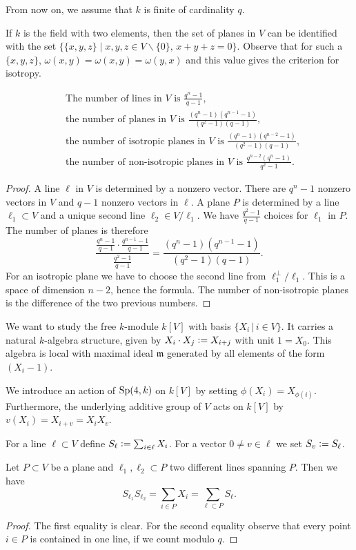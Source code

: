 From now on, we assume that $k$ is finite of cardinality $q$.
\begin{remark} \label{PlaneTriple}
 If $k$ is the field with two elements, then the set of planes in $V$ can be identified with the set $\{\{x,y,z\}\;|\;x,y,z\in V\backslash\{0\},\,x+y+z=0\}$. Observe that for such a $\{x,y,z\}$, $\omega(x,y)=\omega(x,y)=\omega(y,x)$ and this value gives the criterion for isotropy.
\end{remark}
\begin{proposition}\label{OrbitesSp}
\begin{align}
&\text{The number of lines in $V$ is }\frac{q^n-1}{q-1}, \\
&\text{the number of planes in $V$ is }\frac{(q^n-1)(q^{n-1}-1)}{(q^2-1)(q-1)}, \\
&\text{the number of isotropic planes in $V$ is }\frac{(q^n-1)(q^{n-2}-1)}{(q^2-1)(q-1)}, \\
&\text{the number of non-isotropic planes in $V$ is }\frac{q^{n-2}(q^n-1)}{q^2-1}.
\end{align}
\end{proposition}
\begin{proof}
A line $\ell$ in $V$ is determined by a nonzero vector. There are $q^n - 1$ nonzero vectors in $V$ and $q-1$ nonzero vectors in $\ell$. A plane $P$ is determined by a line $\ell_1 \subset V$ and a unique second line $\ell_2\in V/\ell_1$. We have $\frac{q^2-1}{q-1}$ choices for $\ell_1$ in $P$. The number of planes is therefore
$$
\frac{ \frac{q^n-1}{q-1} \cdot\frac{q^{n-1}-1}{q-1}}{\frac{q^2-1}{q-1} } = \frac{(q^n-1)(q^{n-1}-1)}{(q^2-1)(q-1)}.
$$
For an isotropic plane we have to choose the second line from $\ell_1^\perp/\ell_1$. This is a space of dimension $n-2$, hence the formula. The number of non-isotropic planes is the difference of the two previous numbers.
\end{proof}

We want to study the free $k$-module $k[V]$ with basis $\{X_i \,|\, i\in V\}$. It carries a natural $k$-algebra structure, given by
$X_i\cdot X_j \vcentcolon=  X_{i+j}$ with unit $1=X_0$. This algebra is local with maximal ideal $\mathfrak m$ generated by all elements of the form $(X_i-1)$.

We introduce an action of $\operatorname{Sp} (4,k)$ on $k[V]$ by setting $\phi(X_i) = X_{\phi(i)}$. Furthermore, the underlying additive group of $V$ acts on $k[V]$ by $v( X_i) = X_{i+v} =X_iX_v$. 
\begin{definition}
For a line $\ell\subset V$ define $S_\ell \vcentcolon=  \sum_{i\in\ell} X_i$. For a vector $0\neq v\in \ell$ we set $S_v\vcentcolon= S_\ell$.
\end{definition}
\begin{lemma}\label{SympLemma}
Let $P\subset V$ be a plane and $\ell_1,\ell_2\subset P$ two different lines spanning $P$. Then we have
$$
S_{\ell_1}S_{\ell_2}=\sum_{i\in P}X_i = \sum_{\ell\subset P}S_\ell.
$$
\end{lemma}
\begin{proof}
The first equality is clear. For the second equality observe that every point $i\in P$ is contained in one line, if we count modulo $q$.
\end{proof}

